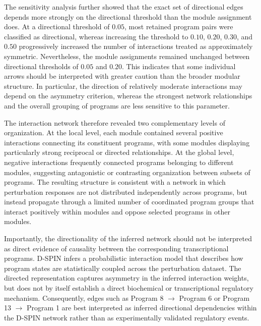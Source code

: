 \documentclass[11pt,a4paper]{article}
\begin{document}
The sensitivity analysis further showed that the exact set of directional edges depends more strongly on the directional threshold than the module assignment does. At a directional threshold of $0.05$, most retained program pairs were classified as directional, whereas increasing the threshold to $0.10$, $0.20$, $0.30$, and $0.50$ progressively increased the number of interactions treated as approximately symmetric. Nevertheless, the module assignments remained unchanged between directional thresholds of $0.05$ and $0.20$. This indicates that some individual arrows should be interpreted with greater caution than the broader modular structure. In particular, the direction of relatively moderate interactions may depend on the asymmetry criterion, whereas the strongest network relationships and the overall grouping of programs are less sensitive to this parameter.

The interaction network therefore revealed two complementary levels of organization. At the local level, each module contained several positive interactions connecting its constituent programs, with some modules displaying particularly strong reciprocal or directed relationships. At the global level, negative interactions frequently connected programs belonging to different modules, suggesting antagonistic or contrasting organization between subsets of programs. The resulting structure is consistent with a network in which perturbation responses are not distributed independently across programs, but instead propagate through a limited number of coordinated program groups that interact positively within modules and oppose selected programs in other modules.

Importantly, the directionality of the inferred network should not be interpreted as direct evidence of causality between the corresponding transcriptional programs. D-SPIN infers a probabilistic interaction model that describes how program states are statistically coupled across the perturbation dataset. The directed representation captures asymmetry in the inferred interaction weights, but does not by itself establish a direct biochemical or transcriptional regulatory mechanism. Consequently, edges such as Program 8 $\rightarrow$ Program 6 or Program 13 $\rightarrow$ Program 1 are best interpreted as inferred directional dependencies within the D-SPIN network rather than as experimentally validated regulatory events.
\end{document}
